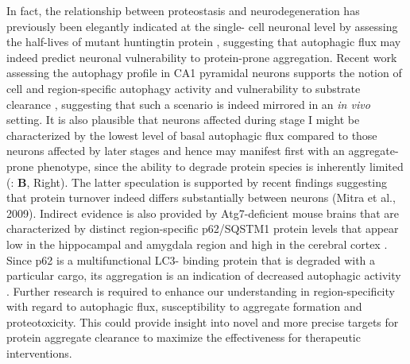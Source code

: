 In fact, the relationship between proteostasis and neurodegeneration has previously been elegantly indicated at the single- cell neuronal level by assessing the half-lives of mutant huntingtin protein \citep{Tsvetkov2013}, suggesting that autophagic flux may indeed predict neuronal vulnerability to protein-prone aggregation. Recent work assessing the autophagy profile in CA1 pyramidal neurons supports the notion of cell and region-specific autophagy activity and vulnerability to substrate clearance \citep{Bordi2016}, suggesting that such a scenario is indeed mirrored in an \textit{in vivo} setting. It is also plausible that neurons affected during stage I might be characterized by the lowest level of basal autophagic flux compared to those neurons affected by later stages and hence may manifest first with an aggregate-prone phenotype, since the ability to degrade protein species is inherently limited (: \textbf{B}, Right). The latter speculation is supported by recent findings suggesting that protein turnover indeed differs substantially between neurons (Mitra et al., 2009). Indirect evidence is also provided by Atg7-deficient mouse brains that are characterized by distinct region-specific p62/SQSTM1 protein levels that appear low in the hippocampal and amygdala region and high in the cerebral cortex \citep{Komatsu2007}. Since p62 is a multifunctional LC3- binding protein that is degraded with a particular cargo, its aggregation is an indication of decreased autophagic activity \citep{Komatsu2007}. Further research is required to enhance our understanding in region-specificity with regard to autophagic flux, susceptibility to aggregate formation and proteotoxicity. This could provide insight into novel and more precise targets for protein aggregate clearance to maximize the effectiveness for therapeutic interventions. 

